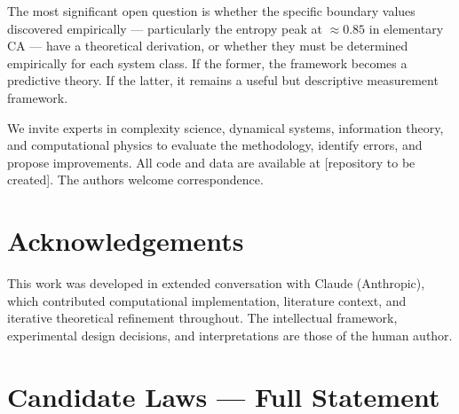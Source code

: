 \documentclass[12pt,a4paper]{article}
\begin{document}
The most significant open question is whether the specific boundary
values discovered empirically — particularly the entropy peak at
$\approx 0.85$ in elementary CA — have a theoretical derivation, or
whether they must be determined empirically for each system class.
If the former, the framework becomes a predictive theory.
If the latter, it remains a useful but descriptive measurement framework.

We invite experts in complexity science, dynamical systems, information
theory, and computational physics to evaluate the methodology, identify
errors, and propose improvements.
All code and data are available at [repository to be created].
The authors welcome correspondence.

\section*{Acknowledgements}

This work was developed in extended conversation with Claude (Anthropic),
which contributed computational implementation, literature context,
and iterative theoretical refinement throughout.
The intellectual framework, experimental design decisions, and
interpretations are those of the human author.


\appendix

\section{Candidate Laws — Full Statement}
\end{document}
